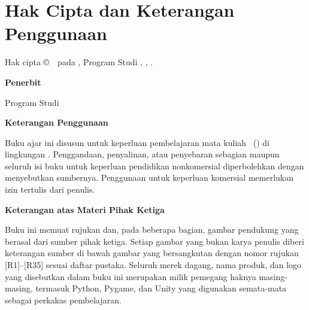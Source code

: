 
\chapter*{Hak Cipta dan Keterangan Penggunaan}
\thispagestyle{plain}

\vspace{0.5cm}

{\bfseries \BookTitle\par}
{\itshape \BookSubtitle\par}
\vspace{0.4cm}

Hak cipta \copyright\ \BookYear\ pada \NamaDosen, Program Studi \NamaProdi,
\NamaFakultas, \NamaPT.

\vspace{0.6cm}

{\bfseries Penerbit\par}
\NamaPT\par
\NamaFakultas\par
Program Studi \NamaProdi

\vspace{0.9cm}

{\bfseries Keterangan Penggunaan\par}

Buku ajar ini disusun untuk keperluan pembelajaran mata kuliah \NamaMK\
(\KodeMK) di lingkungan \NamaPT. Penggandaan, penyalinan, atau penyebaran
sebagian maupun seluruh isi buku untuk keperluan pendidikan nonkomersial
diperbolehkan dengan menyebutkan sumbernya. Penggunaan untuk keperluan
komersial memerlukan izin tertulis dari penulis.

\vspace{0.6cm}

{\bfseries Keterangan atas Materi Pihak Ketiga\par}

Buku ini memuat rujukan dan, pada beberapa bagian, gambar pendukung yang
berasal dari sumber pihak ketiga. Setiap gambar yang bukan karya penulis
diberi keterangan sumber di bawah gambar yang bersangkutan dengan nomor
rujukan \mbox{[R1]}--\mbox{[R35]} sesuai daftar pustaka. Seluruh merek
dagang, nama produk, dan logo yang disebutkan dalam buku ini merupakan
milik pemegang haknya masing-masing, termasuk Python, Pygame, dan Unity
yang digunakan semata-mata sebagai perkakas pembelajaran.

